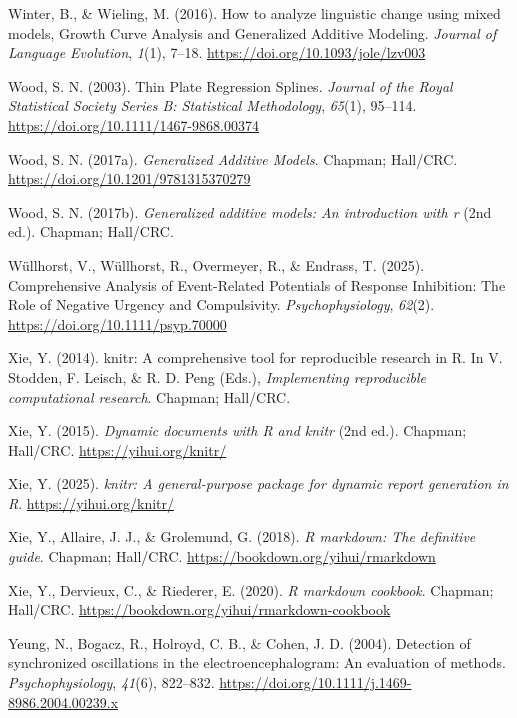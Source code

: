 \documentclass[
  man,
  floatsintext,
  longtable,
  a4paper,
  nolmodern,
  notxfonts,
  notimes,
  colorlinks=true,linkcolor=blue,citecolor=blue,urlcolor=blue]{apa7}
\newlength{\cslhangindent}
\newenvironment{CSLReferences}[2] %
 {\begin{list}{}{%
  \setlength{\itemindent}{0pt}
  \setlength{\leftmargin}{0pt}
  \setlength{\parsep}{0pt}
  \ifodd #1
   \setlength{\leftmargin}{\cslhangindent}
   \setlength{\itemindent}{-1\cslhangindent}
  \fi
  \setlength{\itemsep}{#2\baselineskip}}}
 {\end{list}}
\begin{document}
\begin{CSLReferences}{1}{0}
Winter, B., \& Wieling, M. (2016). How to analyze linguistic change
using mixed models, Growth Curve Analysis and Generalized Additive
Modeling. \emph{Journal of Language Evolution}, \emph{1}(1), 7--18.
\url{https://doi.org/10.1093/jole/lzv003}

Wood, S. N. (2003). Thin Plate Regression Splines. \emph{Journal of the
Royal Statistical Society Series B: Statistical Methodology},
\emph{65}(1), 95--114. \url{https://doi.org/10.1111/1467-9868.00374}

Wood, S. N. (2017a). \emph{Generalized Additive Models}. Chapman;
Hall/CRC. \url{https://doi.org/10.1201/9781315370279}

Wood, S. N. (2017b). \emph{Generalized additive models: An introduction
with r} (2nd ed.). Chapman; Hall/CRC.

Wüllhorst, V., Wüllhorst, R., Overmeyer, R., \& Endrass, T. (2025).
Comprehensive Analysis of Event{-}Related Potentials of Response
Inhibition: The Role of Negative Urgency and Compulsivity.
\emph{Psychophysiology}, \emph{62}(2).
\url{https://doi.org/10.1111/psyp.70000}

Xie, Y. (2014). {knitr}: A comprehensive tool for reproducible research
in {R}. In V. Stodden, F. Leisch, \& R. D. Peng (Eds.),
\emph{Implementing reproducible computational research}. Chapman;
Hall/CRC.

Xie, Y. (2015). \emph{Dynamic documents with {R} and knitr} (2nd ed.).
Chapman; Hall/CRC. \url{https://yihui.org/knitr/}

Xie, Y. (2025). \emph{{knitr}: A general-purpose package for dynamic
report generation in {R}}. \url{https://yihui.org/knitr/}

Xie, Y., Allaire, J. J., \& Grolemund, G. (2018). \emph{R markdown: The
definitive guide}. Chapman; Hall/CRC.
\url{https://bookdown.org/yihui/rmarkdown}

Xie, Y., Dervieux, C., \& Riederer, E. (2020). \emph{R markdown
cookbook}. Chapman; Hall/CRC.
\url{https://bookdown.org/yihui/rmarkdown-cookbook}

Yeung, N., Bogacz, R., Holroyd, C. B., \& Cohen, J. D. (2004). Detection
of synchronized oscillations in the electroencephalogram: An evaluation
of methods. \emph{Psychophysiology}, \emph{41}(6), 822--832.
\url{https://doi.org/10.1111/j.1469-8986.2004.00239.x}

\end{CSLReferences}
\end{document}
